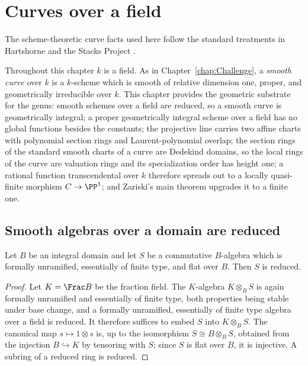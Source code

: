 \chapter{Curves over a field}
\label{chap:Curves}

The scheme-theoretic curve facts used here follow the standard treatments in Hartshorne
\cite{hartshorne-ag} and the Stacks Project \cite{stacks-project}.

Throughout this chapter \(k\) is a field. As in Chapter~\ref{chap:Challenge}, a \emph{smooth
curve} over \(k\) is a \(k\)-scheme which is smooth of relative dimension one, proper, and
geometrically irreducible over \(k\). This chapter provides the geometric substrate for the
genus: smooth schemes over a field are reduced, so a smooth curve is geometrically integral;
a proper geometrically integral scheme over a field has no global functions besides the
constants; the projective line carries two affine charts with polynomial section rings and
Laurent-polynomial overlap; the section rings of the standard smooth charts of a curve are
Dedekind domains, so the local rings of the curve are valuation rings and its
specialization order has height one; a rational function transcendental over \(k\) therefore
spreads out to a locally quasi-finite morphism \(C \to \PP^1\); and Zariski's main theorem
upgrades it to a finite one.

\section{Smooth algebras over a domain are reduced}

\begin{lemma}
  \label{lem:unramified_flat_reduced}
  \leanok
  Let \(B\) be an integral domain and let \(S\) be a commutative \(B\)-algebra which is
  formally unramified, essentially of finite type, and flat over \(B\). Then \(S\) is reduced.
\end{lemma}
\begin{proof}
  \leanok
  Let \(K = \Frac B\) be the fraction field. The \(K\)-algebra \(K \otimes_B S\) is again
  formally unramified and essentially of finite type, both properties being stable under base
  change, and a formally unramified, essentially of finite type algebra over a field is
  reduced. It therefore suffices to embed \(S\) into \(K \otimes_B S\). The canonical map
  \(s \mapsto 1 \otimes s\) is, up to the isomorphism \(S \cong B \otimes_B S\), obtained from
  the injection \(B \hookrightarrow K\) by tensoring with \(S\); since \(S\) is flat over
  \(B\), it is injective. A subring of a reduced ring is reduced.
\end{proof}

